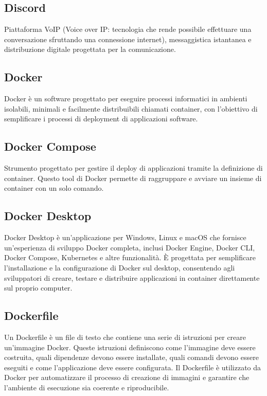 \subsection*{Discord}
Piattaforma VoIP (Voice over IP: tecnologia che rende possibile effettuare una conversazione sfruttando una connessione internet), messaggistica istantanea 
e distribuzione digitale progettata per la comunicazione.

\hypertarget{sec:docker}{}
\subsection*{Docker}
Docker è un software progettato per eseguire processi informatici in ambienti isolabili, minimali e facilmente distribuibili chiamati 
container, con l’obiettivo di semplificare i processi di deployment di applicazioni software.

\hypertarget{sec:docker_compose}{}
\subsection*{Docker Compose}
Strumento progettato per gestire il deploy di applicazioni tramite la definizione di
container. Questo tool di Docker permette di raggruppare e avviare un insieme di
container con un solo comando.

\hypertarget{sec:docker_desktop}{}
\subsection*{Docker Desktop}
Docker Desktop è un'applicazione per Windows, Linux e macOS che fornisce un'esperienza di sviluppo Docker completa, inclusi Docker Engine, Docker CLI, Docker Compose,
Kubernetes e altre funzionalità. È progettata per semplificare l'installazione e la configurazione di Docker sul desktop, consentendo agli sviluppatori di
creare, testare e distribuire applicazioni in container direttamente sul proprio computer.

\hypertarget{sec:dockerfile}{}
\subsection*{Dockerfile}
Un Dockerfile è un file di testo che contiene una serie di istruzioni per creare un'immagine Docker. Queste istruzioni definiscono come l'immagine deve essere
costruita, quali dipendenze devono essere installate, quali comandi devono essere eseguiti e come l'applicazione deve essere configurata. Il Dockerfile è
utilizzato da Docker per automatizzare il processo di creazione di immagini e garantire che l'ambiente di esecuzione sia coerente e riproducibile.

